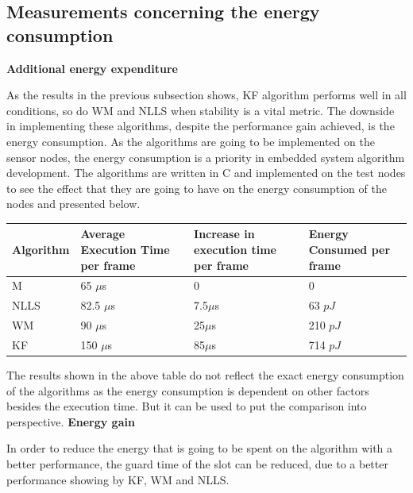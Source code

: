 \documentclass[journal]{IEEEtran}
\begin{document}
\subsection{\textbf{Measurements concerning the energy consumption}}\noindent
\textbf{Additional energy expenditure}\par \noindent
As the results in the previous subsection shows, KF algorithm performs well in all conditions, so do WM and NLLS when stability is a vital metric. The downside in implementing these algorithms, despite the performance gain achieved, is the energy consumption. As the algorithms are going to be implemented on the sensor nodes, the energy consumption is a priority in embedded system algorithm development. The algorithms are written in C and implemented on the test nodes to see the effect that they are going to have on the energy consumption of the nodes and presented below.
\begin{center}
    \begin{tabular}{ |p{1.5cm} | p{2cm} |p{2cm} |p{1.75cm} | }
    \hline
    Algorithm & Average Execution Time per frame & Increase in execution time per frame & Energy Consumed per frame \\ \hline
    M &  65 $\mu$s & 0 & 0  \\ \hline
    NLLS & 82.5 $\mu$s & 7.5$\mu$s & 63 $pJ$  \\ \hline
    WM &   90 $\mu$s & 25$\mu$s & 210 $pJ$ \\ \hline
    KF &  150 $\mu$s  & 85$\mu$s &  714 $pJ$\\ \hline
    \end{tabular}
\label{tab}
\end{center}
The results shown in the above table do not reflect the exact energy consumption of the algorithms as the energy consumption is dependent on other factors besides the execution time. But it can be used to put the comparison into perspective. \newline
\textbf{Energy gain}\par \noindent
In order to reduce the energy that is going to be spent on the algorithm with a better performance, the guard time of the slot can be reduced, due to a better performance showing by KF, WM and NLLS. 
\end{document}
